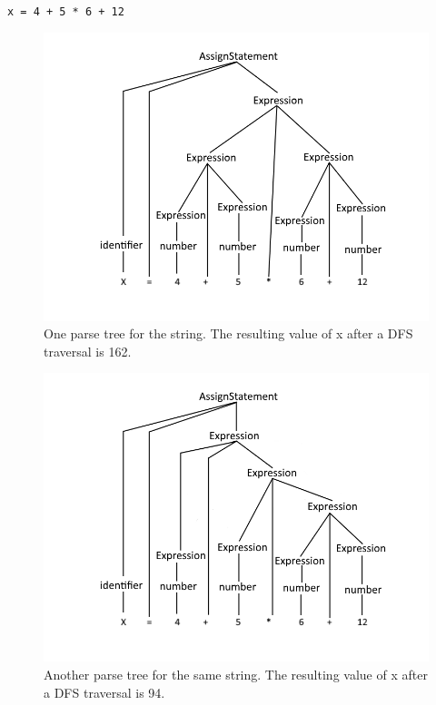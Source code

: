 \texttt{x = 4 + 5 * 6 + 12}

\begin{figure}[H]
	\centering
	\includegraphics[width=\textwidth/2+\textwidth/4]{3.Theory/images/AmbiguousGrammar1.png}
	\caption{
		One parse tree for the string.
		The resulting value of x after a DFS traversal is 162.
	}
	\label{fig:AmbiguousGrammarEx1}
\end{figure}

\begin{figure}[H]
	\centering
	\includegraphics[width=\textwidth/2+\textwidth/4]{3.Theory/images/AmbiguousGrammar2.png}
	\caption{
		Another parse tree for the same string.
		The resulting value of x after a DFS traversal is 94.
	}
	\label{fig:AmbiguousGrammarEx2}
\end{figure}

